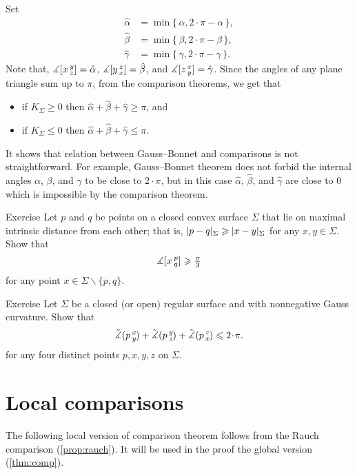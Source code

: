 Set 
\begin{align*}
\hat \alpha&=\min\{\,\alpha,2\cdot\pi-\alpha\,\},
\\
\hat\beta &=\min\{\,\beta,2\cdot\pi-\beta\,\},
\\
\hat\gamma&=\min\{\,\gamma,2\cdot\pi-\gamma\,\}.
\end{align*}
Note that, $\measuredangle[x\,{}^{y}_{z}]=\hat\alpha$,
$\measuredangle[y\,{}^{z}_{x}]=\hat\beta$,
and $\measuredangle[z\,{}^{x}_{y}]=\hat\gamma$.
Since the angles of any plane triangle sum up to $\pi$, from the comparison theorems, we get that
\begin{itemize}
\item if $K_\Sigma\ge 0$ then $\hat\alpha+\hat\beta+\hat\gamma\ge\pi$, and
\item if $K_\Sigma\le 0$ then $\hat\alpha+\hat\beta+\hat\gamma\le\pi$.
\end{itemize}

It shows that relation between Gauss--Bonnet and comparisons is not straightforward.
For example, Gauss--Bonnet theorem does not forbid the internal angles $\alpha$, $\beta$, and $\gamma$ to be close to $2\cdot\pi$, but in this case $\hat\alpha$, $\hat\beta$, and $\hat\gamma$ are close to $0$ which is impossible by the comparison theorem.


\begin{thm}{Exercise}\label{ex:diam-angle}
Let $p$ and $q$ be points on a closed convex surface $\Sigma$ that lie on maximal intrinsic distance from each other;
that is, $|p\z-q|_\Sigma\ge|x-y|_\Sigma$ for any $x,y\in \Sigma$.
Show that 
\[\measuredangle[x\,{}^{p}_{q}]\geqslant \tfrac\pi3\]
for any point $x\in \Sigma\backslash\{p,q\}$.
\end{thm}

\begin{thm}{Exercise}\label{ex:sum=<2pi}
Let $\Sigma$ be a closed (or open) regular surface and with nonnegative Gauss curvature.
Show that 
\[\angk pxy+\angk pyz+\angk pzx\le2\cdot \pi.\]
for any four distinct points $p,x,y,z$ on $\Sigma$.
\end{thm}

\section{Local comparisons}\label{sec:loc-comp}

The following local version of comparison theorem follows from the Rauch comparison (\ref{prop:rauch}).
It will be used in the proof the global version (\ref{thm:comp}).

